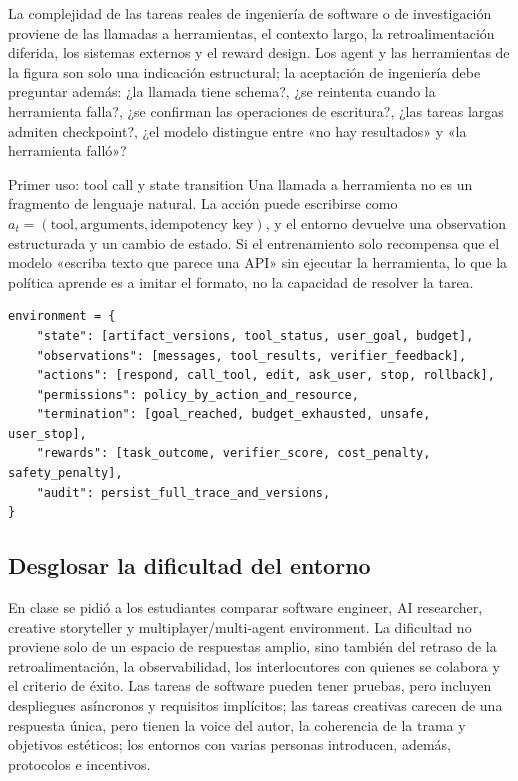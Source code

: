 La complejidad de las tareas reales de ingeniería de software o de investigación proviene de las llamadas a herramientas, el contexto largo, la retroalimentación diferida, los sistemas externos y el reward design. Los agent y las herramientas de la figura son solo una indicación estructural; la aceptación de ingeniería debe preguntar además: ¿la llamada tiene schema?, ¿se reintenta cuando la herramienta falla?, ¿se confirman las operaciones de escritura?, ¿las tareas largas admiten checkpoint?, ¿el modelo distingue entre «no hay resultados» y «la herramienta falló»?


\begin{knowledgebox}{Primer uso: tool call y state transition}
Una llamada a herramienta no es un fragmento de lenguaje natural. La acción puede escribirse como $a_t=(\text{tool},\text{arguments},\text{idempotency key})$, y el entorno devuelve una observation estructurada y un cambio de estado. Si el entrenamiento solo recompensa que el modelo «escriba texto que parece una API» sin ejecutar la herramienta, lo que la política aprende es a imitar el formato, no la capacidad de resolver la tarea.
\end{knowledgebox}

\begin{lstlisting}[caption={Contract de RL environment que sirve tanto para entrenar como para desplegar}]
environment = {
    "state": [artifact_versions, tool_status, user_goal, budget],
    "observations": [messages, tool_results, verifier_feedback],
    "actions": [respond, call_tool, edit, ask_user, stop, rollback],
    "permissions": policy_by_action_and_resource,
    "termination": [goal_reached, budget_exhausted, unsafe, user_stop],
    "rewards": [task_outcome, verifier_score, cost_penalty, safety_penalty],
    "audit": persist_full_trace_and_versions,
}
\end{lstlisting}

\subsection{Desglosar la dificultad del entorno}

En clase se pidió a los estudiantes comparar software engineer, AI researcher, creative storyteller y multiplayer/multi-agent environment. La dificultad no proviene solo de un espacio de respuestas amplio, sino también del retraso de la retroalimentación, la observabilidad, los interlocutores con quienes se colabora y el criterio de éxito. Las tareas de software pueden tener pruebas, pero incluyen despliegues asíncronos y requisitos implícitos; las tareas creativas carecen de una respuesta única, pero tienen la voice del autor, la coherencia de la trama y objetivos estéticos; los entornos con varias personas introducen, además, protocolos e incentivos.

